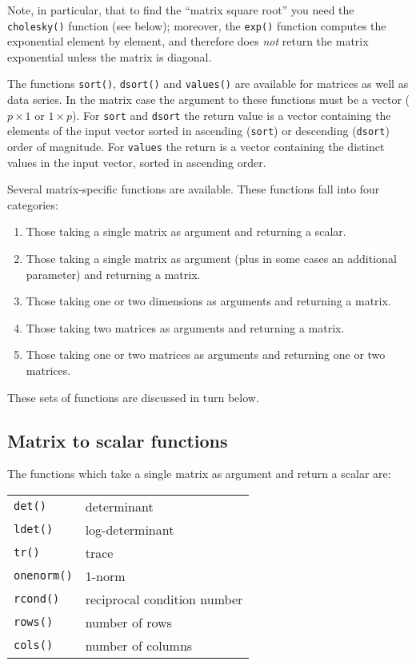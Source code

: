 Note, in particular, that to find the ``matrix square root'' you need
the \texttt{cholesky()} function (see below); moreover, the \texttt{exp()}
function computes the exponential element by element, and therefore
does \emph{not} return the matrix exponential unless the matrix is
diagonal.
  
The functions \texttt{sort()}, \texttt{dsort()} and \texttt{values()}
are available for matrices as well as data series.  In the matrix case
the argument to these functions must be a vector ($p \times 1$ or
$1\times p$).  For \texttt{sort} and \texttt{dsort} the return value
is a vector containing the elements of the input vector sorted in
ascending (\texttt{sort}) or descending (\texttt{dsort}) order of
magnitude.  For \texttt{values} the return is a vector containing the
distinct values in the input vector, sorted in ascending order.

Several matrix-specific functions are available.  These functions fall
into four categories:
%
\begin{enumerate}
\item Those taking a single matrix as argument and returning a scalar.
\item Those taking a single matrix as argument (plus in some cases an
  additional parameter) and returning a matrix.
\item Those taking one or two dimensions as arguments and
  returning a matrix.
\item Those taking two matrices as arguments and returning a matrix.
\item Those taking one or two matrices as arguments and returning one
  or two matrices.
\end{enumerate}
%
These sets of functions are discussed in turn below.

\subsection{Matrix to scalar functions}
\label{matrix-to-scalar}

The functions which take a single matrix as argument and return a
scalar are:

\begin{center}
\begin{tabular}{ll}
\texttt{det()} & determinant \\
\texttt{ldet()} & log-determinant \\
\texttt{tr()} & trace \\
\texttt{onenorm()} & 1-norm \\
\texttt{rcond()} & reciprocal condition number \\
\texttt{rows()} & number of rows \\
\texttt{cols()} & number of columns 
\end{tabular}
\end{center}

